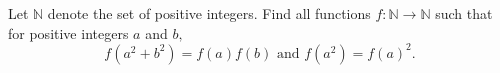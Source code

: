 Let $\mathbb{N}$ denote the set of positive integers. Find all functions $f : \mathbb{N} \rightarrow \mathbb{N}$ such that for positive integers $a$ and $b,$ \[f(a^2 + b^2) = f(a)f(b) \text{ and } f(a^2) = f(a)^2.\]